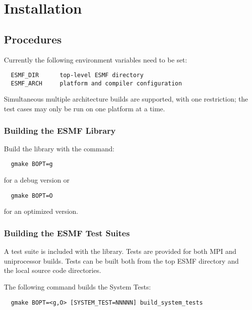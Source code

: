 
\section{Installation}
\label{Installation}

\subsection{Procedures}
\label{InstallProcedures}

Currently the following environment variables need to be set:
\begin{verbatim}
  ESMF_DIR      top-level ESMF directory
  ESMF_ARCH     platform and compiler configuration
\end{verbatim}






Simultaneous multiple architecture builds are supported, with
one restriction; the test cases may only be run on one platform at a time. 

\subsubsection{Building the ESMF Library}
\label{BuildESMF}

Build the library with the command:
\begin{verbatim}
  gmake BOPT=g  
\end{verbatim}
  for a debug version or
\begin{verbatim}
  gmake BOPT=O  
\end{verbatim}
  for an optimized version.

\subsubsection{Building the ESMF Test Suites}
\label{BuildTestSuite}
A test suite is included with the library. Tests are provided for both MPI
and uniprocessor builds. Tests can be built both from the top ESMF directory and
the local source code directories.

\noindent The following command builds the System Tests:
\begin{verbatim}
  gmake BOPT=<g,O> [SYSTEM_TEST=NNNNN] build_system_tests
\end{verbatim}


